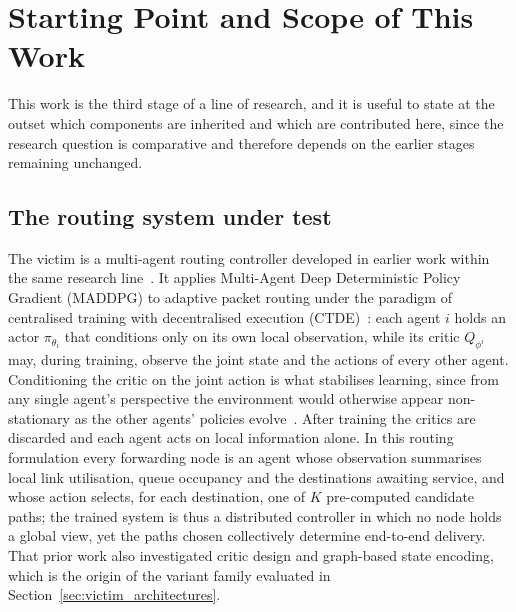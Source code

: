 
\section{Starting Point and Scope of This Work}
\label{sec:starting_point}

This work is the third stage of a line of research, and it is useful to state at
the outset which components are inherited and which are contributed here, since the
research question is comparative and therefore depends on the earlier stages
remaining unchanged.

\subsection{The routing system under test}
\label{subsec:base_system}

The victim is a multi-agent routing controller developed in earlier work within the
same research line~\cite{amaral2021maddpg-routing}. It applies Multi-Agent Deep
Deterministic Policy Gradient (MADDPG) to adaptive packet routing under the
paradigm of centralised training with decentralised execution
(CTDE)~\cite{lowe2017multi}: each agent $i$ holds an actor $\pi_{\theta_i}$ that
conditions only on its own local observation, while its critic $Q_{\phi^i}$ may,
during training, observe the joint state and the actions of every other agent.
Conditioning the critic on the joint action is what stabilises learning, since from
any single agent's perspective the environment would otherwise appear
non-stationary as the other agents' policies evolve~\cite{lowe2017multi}. After
training the critics are discarded and each agent acts on local information alone.
In this routing formulation every forwarding node is an agent whose observation
summarises local link utilisation, queue occupancy and the destinations awaiting
service, and whose action selects, for each destination, one of $K$ pre-computed
candidate paths; the trained system is thus a distributed controller in which no
node holds a global view, yet the paths chosen collectively determine end-to-end
delivery. That prior work also investigated critic design and graph-based state
encoding, which is the origin of the variant family evaluated in
Section~\ref{sec:victim_architectures}.

